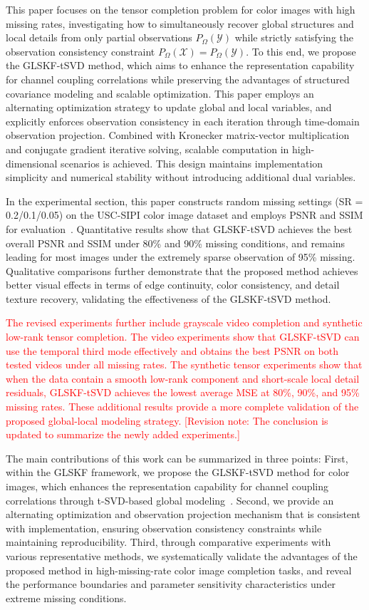 \documentclass[a4paper,12pt]{article}
\numberwithin{equation}{section}
\numberwithin{algorithm}{section}
\newcommand{\rev}[1]{\textcolor{red}{#1}}
\newcommand{\revnote}[1]{\textcolor{red}{[Revision note: #1]}}
\theoremstyle{remark}
\theoremstyle{definition}
\begin{document}
This paper focuses on the tensor completion problem for color images with high missing rates, investigating how to simultaneously recover global structures and local details from only partial observations $P_{\Omega}(\mathcal{Y})$ while strictly satisfying the observation consistency constraint $P_{\Omega}(\mathcal{X}) = P_{\Omega}(\mathcal{Y})$. To this end, we propose the GLSKF-tSVD method, which aims to enhance the representation capability for channel coupling correlations while preserving the advantages of structured covariance modeling and scalable optimization.
This paper employs an alternating optimization strategy to update global and local variables, and explicitly enforces observation consistency in each iteration through time-domain observation projection. Combined with Kronecker matrix-vector multiplication and conjugate gradient iterative solving, scalable computation in high-dimensional scenarios is achieved. This design maintains implementation simplicity and numerical stability without introducing additional dual variables.

In the experimental section, this paper constructs random missing settings (SR = 0.2/0.1/0.05) on the USC-SIPI color image dataset and employs PSNR and SSIM for evaluation~\cite{wang2004ssim}. Quantitative results show that GLSKF-tSVD achieves the best overall PSNR and SSIM under 80\% and 90\% missing conditions, and remains leading for most images under the extremely sparse observation of 95\% missing. Qualitative comparisons further demonstrate that the proposed method achieves better visual effects in terms of edge continuity, color consistency, and detail texture recovery, validating the effectiveness of the GLSKF-tSVD method.

\rev{The revised experiments further include grayscale video completion and synthetic low-rank tensor completion. The video experiments show that GLSKF-tSVD can use the temporal third mode effectively and obtains the best PSNR on both tested videos under all missing rates. The synthetic tensor experiments show that when the data contain a smooth low-rank component and short-scale local detail residuals, GLSKF-tSVD achieves the lowest average MSE at 80\%, 90\%, and 95\% missing rates. These additional results provide a more complete validation of the proposed global-local modeling strategy.} \revnote{The conclusion is updated to summarize the newly added experiments.}

The main contributions of this work can be summarized in three points: First, within the GLSKF framework, we propose the GLSKF-tSVD method for color images, which enhances the representation capability for channel coupling correlations through t-SVD-based global modeling~\cite{zhang2017tsvd}. Second, we provide an alternating optimization and observation projection mechanism that is consistent with implementation, ensuring observation consistency constraints while maintaining reproducibility. Third, through comparative experiments with various representative methods, we systematically validate the advantages of the proposed method in high-missing-rate color image completion tasks, and reveal the performance boundaries and parameter sensitivity characteristics under extreme missing conditions.
\end{document}
